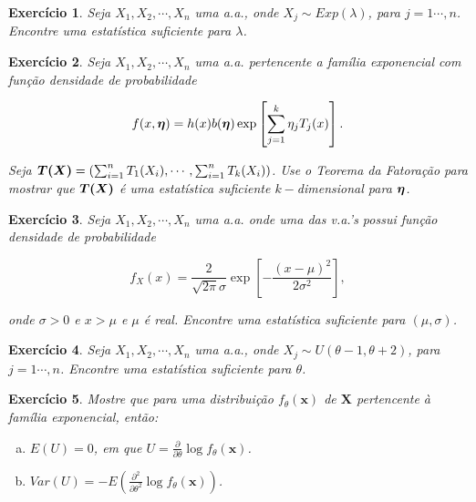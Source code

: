 \documentclass[letter,11pt]{article}
\newtheorem{exer}{Exercício}
\newcommand{\mat}[1]{\mbox{\boldmath{$#1$}}}
\begin{document}
\smallskip
\begin{exer} \rm
Seja $X_1,X_2,\cdots,X_n$ uma a.a., onde $X_j\sim Exp(\lambda)$, para 
$j=1\cdots,n$. Encontre uma estatística suficiente para $\lambda$.
\end{exer}


\smallskip
\begin{exer} \rm
Seja $X_1,X_2,\cdots,X_n$ uma a.a. pertencente a família exponencial com função 
densidade de probabilidade

$$f(x,\mat{\eta})=h(x)b(\mat{\eta})\exp\left[\sum_{j=1}^{k}\eta_j T_j(x)\right].$$

\noindent Seja
$\mat{T(X)}=\left(\sum_{i=1}^{n}T_1(X_i),\cdots,\sum_{i=1}^{n}T_k(X_i)\right)$.
Use o Teorema da Fatoração para mostrar que $\mat{T(X)}$ é uma estatística 
suficiente $k-$dimensional para $\mat{\eta}$.
\end{exer}


\smallskip
\begin{exer} \rm 
Seja $X_1,X_2,\cdots,X_n$ uma a.a. onde uma das v.a.'s possui função densidade de 
probabilidade

$$f_X(x)=\frac{2}{\sqrt{2\pi}\sigma}\exp\left[-\frac{(x-\mu)^2}{2\sigma^2}\right],$$

\noindent onde $\sigma>0$ e $x>\mu$ e $\mu$ é real. Encontre uma
estatística suficiente para $(\mu,\sigma)$.
\end{exer}

\smallskip
\begin{exer} \rm
Seja $X_1,X_2,\cdots,X_n$ uma a.a., onde $X_j\sim U(\theta-1,\theta+2)$, para 
$j=1\cdots,n$. Encontre uma estatística suficiente para $\theta$.
\end{exer}

\smallskip
\begin{exer} \rm
Mostre que para uma distribuição $f_{\theta}(\boldsymbol{x})$ de $\boldsymbol{X}$ 
pertencente à família exponencial, então:
\begin{enumerate}[a)]
  \item $E(U)=0$, em que $U=\frac{\partial}{\partial \theta} \log f_{\theta}(\boldsymbol{x})$.
  \item $Var(U) = - E \left( \frac{\partial^2}{\partial \theta^2} \log f_{\theta}(\boldsymbol{x}) \right)$.
\end{enumerate}
\end{exer}
\end{document}

